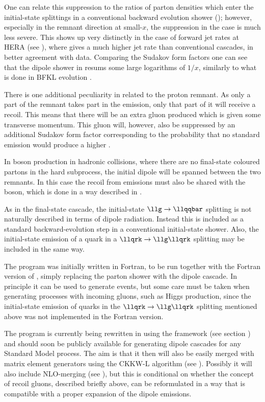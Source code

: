 One can relate this suppression to the ratios of parton densities
which enter the initial-state splittings in a conventional backward
evolution shower (\cf {});
 however, especially in the remnant direction at
small-$x$, the suppression in the \Ariadne case is much less
severe. This shows up very distinctly in the case of forward jet rates
at HERA (see \eg \cite{Aktas:2005up}), where \Ariadne gives a much
higher jet rate than conventional cascades, in better agreement with
data. Comparing the Sudakov form factors one can see that the dipole
shower in \Ariadne resums some large logarithms of $1/x$, similarly to
what is done in BFKL evolution \cite{Rathsman:1996jc}.

There is one additional peculiarity in \Ariadne related to the proton
remnant. As only a part of the remnant takes part in the emission,
only that part of it will receive a recoil. This means that there will
be an extra gluon produced which is given some transverse
momentum. This gluon will, however, also be suppressed by an
additional Sudakov form factor corresponding to the probability that
no standard emission would produce a higher \llipt.

In \eg \llW boson production in hadronic collisions, where there are no
final-state coloured partons in the hard subprocess, the initial
dipole will be spanned between the two remnants. In this case the
recoil from emissions must also be shared with the \llW boson, which
is done in a way described in \cite{Lonnblad:1995ex}.

As in the final-state cascade, the initial-state $\llg\to\llqqbar$
splitting is not naturally described in terms of dipole
radiation. Instead this is included as a standard backward-evolution
step in a conventional initial-state shower. Also, the initial-state
emission of a quark in a $\llqrk\to\llg\llqrk$ splitting may be
included in the same way.


The \Ariadne program was initially written in Fortran, to be run
together with the Fortran version of \Pythia, simply replacing the
\Pythia parton shower with the dipole cascade. In principle it can be
used to generate \lhc events, but some care must be taken when
generating processes with incoming gluons, such as Higgs production,
since the initial-state emission of quarks in the $\llqrk\to\llg\llqrk$
splitting mentioned above was not implemented in the Fortran version.

The \Ariadne program is currently being rewritten in \Cpp using the
\thepeg framework \cite{Lonnblad:2006pt} (see section
) and should soon be publicly available for
generating dipole cascades for any Standard Model process. The aim is
that it then will also be easily merged with matrix element generators
using the CKKW-L algorithm (see
). Possibly it will also include
NLO-merging (see ), but this is conditional on
whether the concept of recoil gluons, described briefly above, can be
reformulated in a way that is compatible with a proper \alphaS
expansion of the dipole emissions.

